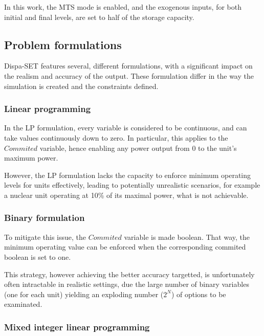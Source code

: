 In this work, the MTS mode is enabled, and the exogenous inputs, for both initial and final levels, are set to half of the storage capacity.

\subsection{Problem formulations}

Dispa-SET features several, different formulations, with a significant impact on the realism and accuracy of the output. These formulation differ in the way the simulation is created and the constraints defined.

\subsubsection{Linear programming}

In the LP formulation, every variable is considered to be continuous, and can take values continuously down to zero. In particular, this applies to the $Commited$ variable, hence enabling any power output from 0 to the unit's maximum power.

However, the LP formulation lacks the capacity to enforce minimum operating levels for units effectively, leading to potentially unrealistic scenarios, for example a nuclear unit operating at 10\% of its maximal power, what is not achievable.

\subsubsection{Binary formulation}

To mitigate this issue, the $Commited$ variable is made boolean. That way, the minimum operating value can be enforced when the corresponding commited boolean is set to one.

This strategy, however achieving the better accuracy targetted, is unfortunately often intractable in realistic settings, due the large number of binary variables (one for each unit) yielding an exploding number ($2^N$) of options to be examinated.

\subsubsection{Mixed integer linear programming \label{subsubsection:milp}}


